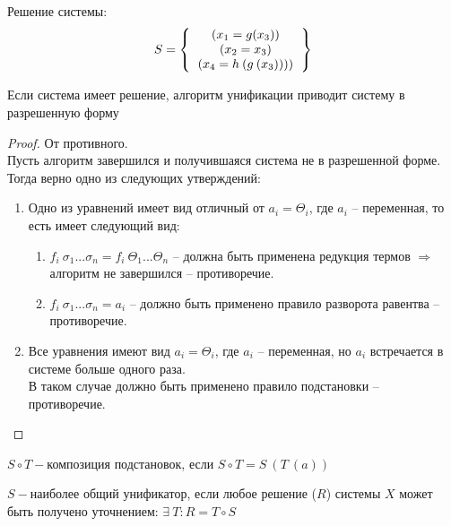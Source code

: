 			Решение системы:
		\[		S=
			\left \{
			\begin{tabular}{c}
				$(x_1=g(x_3))$\\
				$(x_2=x_3)$\\
				$(x_4=h\:(g\:(x_3))))$\\
			\end{tabular}
			\right \}
		\]				
			
	\begin{statement} Если система имеет решение, алгоритм унификации приводит систему в разрешенную форму \end{statement}
	\begin{proof}
		От противного. \\ 
		Пусть алгоритм завершился и получившаяся система не в разрешенной форме.\\
		Тогда верно одно из следующих утверждений:
		\begin{enumerate}
			\item Одно из уравнений имеет вид отличный от $a_i = \Theta_i$, где $a_i$ -- переменная, то есть имеет следующий вид:
			\begin{enumerate}
				\item $f_i ~ \sigma_1 ... \sigma_n = f_i ~ \Theta_1 ... \Theta_n$ -- должна быть применена редукция термов $\Rightarrow$ алгоритм не завершился -- противоречие.
				\item $f_i ~ \sigma_1 ... \sigma_n = a_i$ -- должно быть применено правило разворота равентва -- противоречие.
			\end{enumerate}
			\item Все уравнения имеют вид $a_i = \Theta_i$, где $a_i$ -- переменная, но $a_i$ встречается в системе больше одного раза. \\
			В таком случае должно быть применено правило подстановки -- противоречие.
		\end{enumerate}
	\end{proof}
	\begin{definition} $S \circ T-$композиция подстановок, если $S \circ T=S\:(T\:(a))$\end{definition}
	\begin{definition} $S-$наиболее общий унификатор, если любое решение ($R$) системы $X$ может быть получено уточнением: $\exists\:T:R=T\circ S$\end{definition}
	
